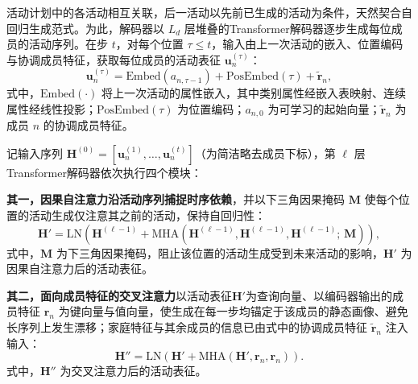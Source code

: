 活动计划中的各活动相互关联，后一活动以先前已生成的活动为条件，天然契合自回归生成范式。为此，解码器以 $L_d$ 层堆叠的Transformer解码器逐步生成每位成员的活动序列。在步 $t$，对每个位置 $\tau\le t$，输入由上一次活动的嵌入、位置编码与协调成员特征，获取每位成员的活动表征 $\mathbf{u}_n^{(\tau)}$：
\begin{equation}
\mathbf{u}_n^{(\tau)}=\mathrm{Embed}\!\left(a_{n,\tau-1}\right)+\mathrm{PosEmbed}(\tau)+\tilde{\mathbf{r}}_n,
\label{eq.cohact.decin}
\end{equation}
式中，$\mathrm{Embed}(\cdot)$ 将上一次活动的属性嵌入，其中类别属性经嵌入表映射、连续属性经线性投影；$\mathrm{PosEmbed}(\tau)$ 为位置编码；$a_{n,0}$ 为可学习的起始向量；$\tilde{\mathbf{r}}_n$ 为成员 $n$ 的协调成员特征。

记输入序列 $\mathbf{H}^{(0)}=[\mathbf{u}_n^{(1)},\dots,\mathbf{u}_n^{(t)}]$（为简洁略去成员下标），第 $\ell$ 层Transformer解码器依次执行四个模块：

\textbf{其一，因果自注意力沿活动序列捕捉时序依赖}，并以下三角因果掩码 $\mathbf{M}$ 使每个位置的活动生成仅注意其之前的活动，保持自回归性：
\begin{equation}
\mathbf{H}'=\mathrm{LN}\!\left(\mathbf{H}^{(\ell-1)}+\mathrm{MHA}\!\left(\mathbf{H}^{(\ell-1)},\mathbf{H}^{(\ell-1)},\mathbf{H}^{(\ell-1)};\,\mathbf{M}\right)\right),
\label{eq.cohact.decself}
\end{equation}
式中，$\mathbf{M}$ 为下三角因果掩码，阻止该位置的活动生成受到未来活动的影响，$\mathbf{H}'$ 为因果自注意力后的活动表征。

\textbf{其二，面向成员特征的交叉注意力}以活动表征$\mathbf{H}'$为查询向量、以编码器输出的成员特征 $\mathbf{r}_n$ 为键向量与值向量，使生成在每一步均锚定于该成员的静态画像、避免长序列上发生漂移；家庭特征与其余成员的信息已由式中的协调成员特征 $\tilde{\mathbf{r}}_n$ 注入输入：
\begin{equation}
\mathbf{H}''=\mathrm{LN}\!\left(\mathbf{H}'+\mathrm{MHA}\!\left(\mathbf{H}',\mathbf{r}_n,\mathbf{r}_n\right)\right).
\label{eq.cohact.deccross}
\end{equation}
式中，$\mathbf{H}''$ 为交叉注意力后的活动表征。

